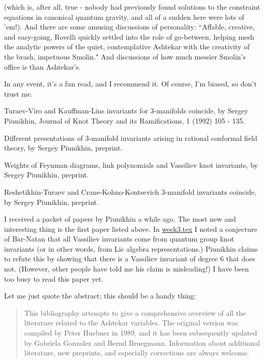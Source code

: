 (which is, after all, true - nobody had previously found solutions to the constraint equations in canonical quantum gravity, and all of a sudden here were lots of 'em!). And there are some amusing discussions of personality: ``Affable, creative, and easy-going, Rovelli quickly settled into the role of go-between, helping mesh the analytic powers of the quiet, contemplative Ashtekar with the creativity of the brash, impetuous Smolin." And discussions of how much messier Smolin's office is than Ashtekar's.

In any event, it's a fun read, and I recommend it. Of course, I'm biased, so don't trust me.


Turaev-Viro and Kauffman-Lins invariants for 3-manifolds coincide, by Sergey Piunikhin, Journal of Knot Theory and its Ramifications, 1 (1992) 105 - 135.

Different presentations of 3-manifold invariants arising in rational conformal field theory, by Sergey Piunikhin, preprint.

Weights of Feynman diagrams, link polynomials and Vassiliev knot invariants, by Sergey Piunikhin, preprint.

Reshetikhin-Turaev and Crane-Kohno-Kontsevich 3-manifold invariants coincide, by Sergey Piunikhin, preprint.

I received a packet of papers by Piunikhin a while ago. The most new and interesting thing is the first paper listed above. In {\hyperref[week3]{week3.tex}} I noted a conjecture of Bar-Natan that all Vassiliev invariants come from quantum group knot invariants (or in other words, from Lie algebra representations.) Piunikhin claims to refute this by showing that there is a Vassiliev invariant of degree 6 that does not. (However, other people have told me his claim is misleading!) I have been too busy to read this paper yet.


Let me just quote the abstract; this should be a handy thing:

\begin{quote}
    This bibliography attempts to give a comprehensive overview of all the literature related to the Ashtekar variables. The original version was compiled by Peter Huebner in 1989, and it has been subsequently updated by Gabriela Gonzalez and Bernd Bruegmann. Information about additional literature, new preprints, and especially corrections are always welcome.
\end{quote}

